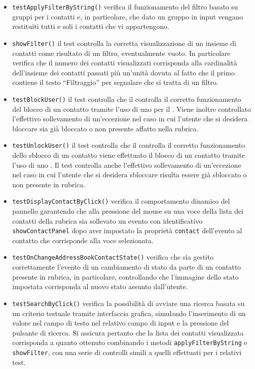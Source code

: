 \begin{itemize}
\begin{itemize}
\item \texttt{testApplyFilterByString()} verifica il funzionamento del filtro basato su gruppi per i contatti e, in particolare, che dato un gruppo in input vengano restituiti tutti e soli i contatti che vi appartengono.

\item \texttt{showFilter()} il test controlla la corretta visualizzazione di un insieme di contatti come risultato di un filtro, eventualmente vuoto. In particolare verifica che il numero dei contatti visualizzati corrisponda alla cardinalità dell'insieme dei contatti passati più un'unità dovuta al fatto che il primo  contiene il testo ``Filtraggio'' per segnalare che si tratta di un filtro.

\item \texttt{testBlockUser()} il test controlla che il controlla il corretto funzionamento del blocco di un contatto tramite l'uso di uno  per il . Viene inoltre controllato l'effettivo sollevamento di un'eccezione nel caso in cui l'utente che si desidera bloccare sia già bloccato o non presente affatto nella rubrica.

\item \texttt{testUnlockUser()} il test controlla che il controlla il corretto funzionamento dello sblocco di un contatto viene effettuato il blocco di un contatto tramite l'uso di uno . Il test controlla anche l'effettivo sollevamento di un'eccezione nel caso in cui l'utente che si desidera sbloccare risulta essere già sbloccato o non presente in rubrica.

\item \texttt{testDisplayContactByClick()} verifica il comportamento dinamico del pannello garantendo che alla pressione del mouse su una voce della lista dei contatti della rubrica sia sollevato un evento con identificativo \verb'showContactPanel' dopo aver impostato la proprietà \verb'contact' dell'evento al contatto che corrisponde alla voce selezionata.

\item \texttt{testOnChangeAddressBookContactState()} verifica che sia gestito correttamente l'evento di un cambiamento di stato da parte di un contatto presente in rubrica, in particolare, controllando che l'immagine dello stato impostata corrisponda al nuovo stato assunto dall'utente.

\item \texttt{testSearchByClick()} verifica la possibilità di avviare una ricerca basata su un criterio testuale tramite interfaccia grafica, simulando l'inserimento di un valore nel campo di testo nel relativo campo di input e la pressione del pulsante di ricerca. Si assicura pertanto che la lista dei contatti visualizzata corrisponda a quanto ottenuto combinando i metodi \verb'applyFilterByString' e \verb'showFilter', con una serie di controlli simili a quelli effettuati per i relativi test.


\end{itemize}
\end{itemize}
